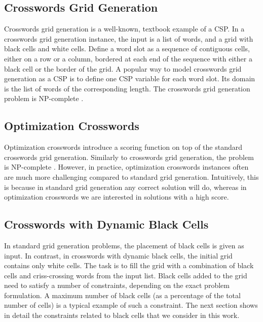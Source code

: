 \subsection{Crosswords Grid Generation}

Crosswords grid generation is a well-known, textbook example of a CSP.
In a crosswords grid generation instance, the input is a list of words, and 
a grid with black cells and white cells.
Define a word slot as a sequence of contiguous cells, either on a row or a column,
bordered at each end of the sequence with either a black cell or the border of the grid.
A popular way to model crosswords grid generation as a CSP is to 
define one CSP variable for each word slot.
Its domain is the list of words of the corresponding length.
The crosswords grid generation problem is NP-complete \cite{garey1979computers,10.1007/978-3-642-30347-0_15}.

\subsection{Optimization Crosswords}

Optimization crosswords introduce a scoring function on top of the 
standard crosswords grid generation.
Similarly to crosswords grid generation, the problem is NP-complete \cite{DBLP:conf/socs/BoteaB21}.
However, in practice, optimization crosswords instances often are much more
challenging compared to standard grid generation.
Intuitively, this is because in standard grid generation any correct solution will do,
whereas in optimization crosswords we are interested in solutions with a high score.

\subsection{Crosswords with Dynamic Black Cells}

In standard grid generation problems, the placement of black cells is
given as input.
In contrast, in crosswords with dynamic black cells, the initial grid contains 
only white cells. 
The task is to fill the grid with a combination of black cells
and criss-crossing words from the input list.
Black cells added to the grid need to satisfy a number of constraints,
depending on the exact problem formulation.
A maximum number of black cells (as a percentage of the total number of cells)
is a typical example of such a constraint.
The next section shows in detail the constraints related to black cells 
that we consider in this work.

